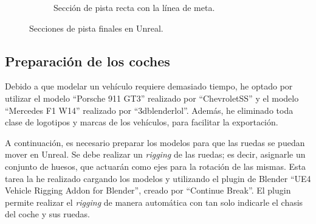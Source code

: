 \begin{figure}[H]
\begin{subfigure}[t]{0.48\textwidth}
        \caption{Sección de pista recta con la línea de meta.}
        \label{fig:curvafinishlinefinal}
    \end{subfigure}

    \caption{Secciones de pista finales en Unreal.}
    \label{fig:seccionespista}
\end{figure}

\newpage

\subsection{Preparación de los coches}

Debido a que modelar un vehículo requiere demasiado tiempo, he optado por utilizar el modelo ``Porsche 911 GT3''\cite{porsche} realizado por ``ChevroletSS'' y el modelo ``Mercedes F1 W14''\cite{f1} realizado por ``3dblenderlol''. Además, he eliminado toda clase de logotipos y marcas de los vehículos, para facilitar la exportación.

\bigskip

A continuación, es necesario preparar los modelos para que las ruedas se puedan mover en Unreal. Se debe realizar un \textit{rigging} de las ruedas; es decir, asignarle un conjunto de huesos, que actuarán como ejes para la rotación de las mismas. Esta tarea la he realizado cargando los modelos y utilizando el plugin de Blender ``UE4 Vehicle Rigging Addon for Blender''\cite{blenderplugin}, creado por ``Continue Break''. El plugin permite realizar el \textit{rigging} de manera automática con tan solo indicarle el chasis del coche y sus ruedas.

